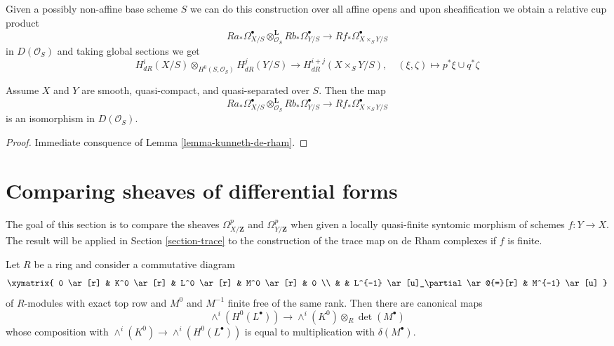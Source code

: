 \noindent
Given a possibly non-affine base scheme $S$ we can do this
construction over all affine opens and upon sheafification
we obtain a relative cup product
$$
Ra_*\Omega^\bullet_{X/S}
\otimes_{\mathcal{O}_S}^\mathbf{L}
Rb_*\Omega^\bullet_{Y/S}
\longrightarrow
Rf_*\Omega^\bullet_{X \times_S Y/S}
$$
in $D(\mathcal{O}_S)$ and taking global sections we get
$$
H^i_{dR}(X/S) \otimes_{H^0(S, \mathcal{O}_S)} H^j_{dR}(Y/S)
\longrightarrow
H^{i + j}_{dR}(X \times_S Y/S),\quad
(\xi, \zeta) \longmapsto p^*\xi \cup q^*\zeta
$$

\begin{lemma}
\label{lemma-kunneth-de-rham-relative}
Assume $X$ and $Y$ are smooth, quasi-compact, and quasi-separated over
$S$. Then the map
$$
Ra_*\Omega^\bullet_{X/S}
\otimes_{\mathcal{O}_S}^\mathbf{L}
Rb_*\Omega^\bullet_{Y/S}
\longrightarrow
Rf_*\Omega^\bullet_{X \times_S Y/S}
$$
is an isomorphism in $D(\mathcal{O}_S)$.
\end{lemma}

\begin{proof}
Immediate consquence of Lemma \ref{lemma-kunneth-de-rham}.
\end{proof}







\section{Comparing sheaves of differential forms}
\label{section-quasi-finite-syntomic}

\noindent
The goal of this section is to compare the sheaves
$\Omega^p_{X/\mathbf{Z}}$ and $\Omega^p_{Y/\mathbf{Z}}$
when given a locally quasi-finite syntomic morphism of schemes $f : Y \to X$.
The result will be applied in Section \ref{section-trace}
to the construction of the trace map on de Rham complexes if $f$ is finite.

\begin{lemma}
\label{lemma-funny-map}
Let $R$ be a ring and consider a commutative diagram
$$
\xymatrix{
0 \ar[r] &
K^0 \ar[r] &
L^0 \ar[r] &
M^0 \ar[r] & 0 \\
& & L^{-1} \ar[u]_\partial \ar@{=}[r] &
M^{-1} \ar[u]
}
$$
of $R$-modules with exact top row and $M^0$ and $M^{-1}$
finite free of the same rank. Then there are canonical maps
$$
\wedge^i(H^0(L^\bullet)) \longrightarrow \wedge^i(K^0) \otimes_R \det(M^\bullet)
$$
whose composition with $\wedge^i(K^0) \to \wedge^i(H^0(L^\bullet))$
is equal to multiplication with $\delta(M^\bullet)$.
\end{lemma}

